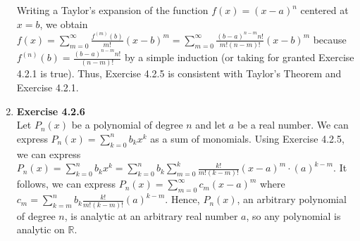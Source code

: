 \documentclass[10pt]{article}
\begin{document}
\begin{enumerate}[label=Problem \arabic*.]
Writing a Taylor's expansion of the function $f(x)=(x-a)^n$ centered at $x=b$, we obtain $\displaystyle f(x)=\sum_{m=0}^{\infty}\frac{f^{(m)}(b)}{m!}(x-b)^m=\sum_{m=0}^{\infty}\frac{(b-a)^{n-m}n!}{m!(n-m)!}(x-b)^m$ because $f^{(n)}(b)=\frac{(b-a)^{n-m}n!}{(n-m)!}$ by a simple induction (or taking for granted Exercise 4.2.1 is true).
Thus, Exercise 4.2.5 is consistent with Taylor's Theorem and Exercise 4.2.1.\\
    \item \textbf{Exercise 4.2.6}\\
Let $P_n(x)$ be a polynomial of degree $n$ and let $a$ be a real number.
We can express $P_n(x)=\displaystyle\sum_{k=0}^{n}b_k x^k$ as a sum of monomials.
Using Exercise 4.2.5, we can express $P_n(x)=\displaystyle\sum_{k=0}^{n}b_k x^k=\sum_{k=0}^{n}b_k\sum_{m=0}^{k}\frac{k!}{m!(k-m)!}(x-a)^m\cdot (a)^{k-m}$.
It follows, we can express $P_n(x)=\displaystyle\sum_{m=0}^{\infty}c_m(x-a)^m$ where $c_m=\displaystyle\sum_{k=m}^{n}b_k\frac{k!}{m!(k-m)!}(a)^{k-m}$.
Hence, $P_n(x)$, an arbitrary polynomial of degree $n$, is analytic at an arbitrary real number $a$, so any polynomial is analytic on $\mathbb{R}$.
\end{enumerate}
\end{document}
